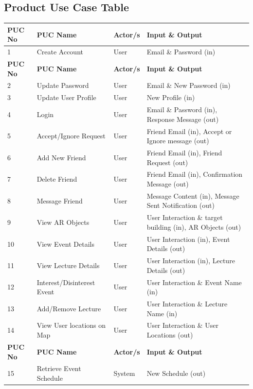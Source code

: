 \documentclass[12pt]{article}
\begin{document}
\subsection{Product Use Case Table}

\begin{longtable}
 {p{} | p{} | p{} | p{}}
  \toprule
  \textbf{PUC No} & \textbf{PUC Name} & \textbf{Actor/s} & \textbf{Input \& Output}\\
  \midrule
  1 & Create Account & User & Email \& Password (in)\\
  \midrule
  \textbf{PUC No} & \textbf{PUC Name} & \textbf{Actor/s} & \textbf{Input \& Output}\\
  \midrule
  2 & Update Password & User & Email \& New Password (in)\\
  \midrule
  3 & Update User Profile & User & New Profile (in)\\
  \midrule
  4 & Login & User & Email \& Password (in),  Response Message (out)\\
   \midrule
  5 & Accept/Ignore Request & User & Friend Email (in), Accept or Ignore message (out)\\
  \midrule
  6 & Add New Friend & User & Friend Email (in), Friend Request (out)\\
  \midrule
  7 & Delete Friend & User & Friend Email (in), Confirmation Message (out)\\
  \midrule
  8 & Message Friend & User & Message Content (in), Message Sent Notification (out)\\
  \midrule
   9 & View AR Objects & User & User Interaction \& target building (in), AR Objects (out)\\
  \midrule
  10 & View Event Details & User & User Interaction (in), Event Details (out)\\
  \midrule
  11 & View Lecture Details & User & User Interaction (in), Lecture Details (out)\\
  \midrule
  12 & Interest/Disinterest Event & User & User Interaction \& Event Name (in)\\
  \midrule
  13 & Add/Remove Lecture & User & User Interaction \& Lecture Name (in)\\
  \midrule
  14 & View User locations on Map & User & User Interaction \& User Locations (out)\\
  \midrule
  \textbf{PUC No} & \textbf{PUC Name} & \textbf{Actor/s} & \textbf{Input \& Output}\\
  \midrule
  15 & Retrieve Event Schedule & System & New Schedule (out)\\

\end{longtable}
\end{document}
